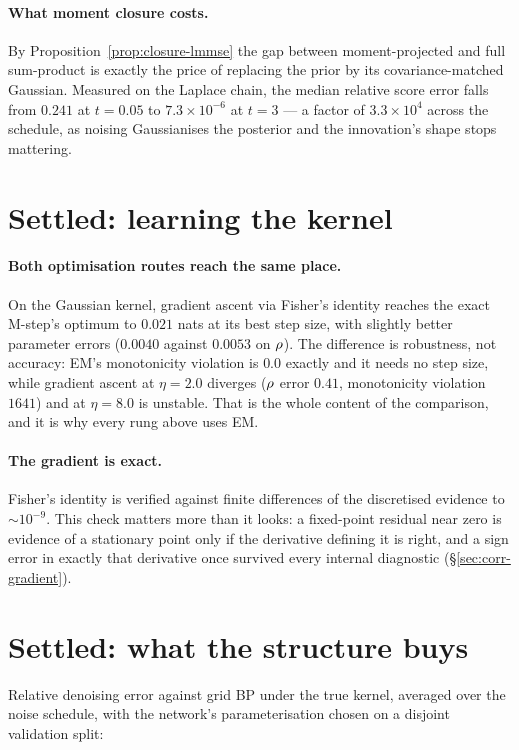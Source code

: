 \paragraph{What moment closure costs.} By Proposition~\ref{prop:closure-lmmse} the gap between
moment-projected and full sum-product is exactly the price of replacing the prior by its
covariance-matched Gaussian. Measured on the Laplace chain, the median relative score error falls
from $0.241$ at $t=0.05$ to $7.3\times10^{-6}$ at $t=3$ --- a factor of $3.3\times10^{4}$ across
the schedule, as noising Gaussianises the posterior and the innovation's shape stops mattering.

\section{Settled: learning the kernel}

\paragraph{Both optimisation routes reach the same place.} On the Gaussian kernel, gradient
ascent via Fisher's identity reaches the exact M-step's optimum to $0.021$ nats at its best step
size, with slightly better parameter errors ($0.0040$ against $0.0053$ on $\rho$). The
difference is robustness, not accuracy: EM's monotonicity violation is $0.0$ exactly and it needs
no step size, while gradient ascent at $\eta=2.0$ diverges ($\rho$ error $0.41$, monotonicity
violation $1641$) and at $\eta=8.0$ is unstable. That is the whole content of the comparison, and
it is why every rung above uses EM.

\paragraph{The gradient is exact.} Fisher's identity is verified against finite differences of
the discretised evidence to ${\sim}10^{-9}$. This check matters more than it looks: a fixed-point
residual near zero is evidence of a stationary point only if the derivative defining it is right,
and a sign error in exactly that derivative once survived every internal diagnostic
(\S\ref{sec:corr-gradient}).

\section{Settled: what the structure buys}
\label{sec:rec-efficiency}

Relative denoising error against grid BP under the true kernel, averaged over the noise schedule,
with the network's parameterisation chosen on a disjoint validation split:

